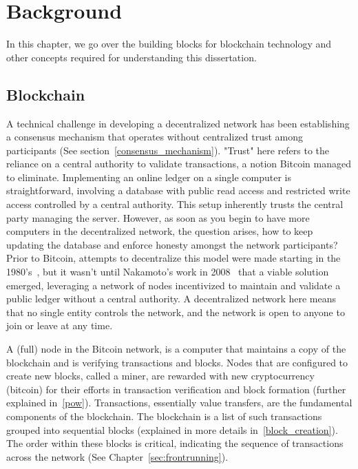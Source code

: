 


\chapter{Background} \label{sec:background}

In this chapter, we go over the building blocks for blockchain technology and other concepts required for understanding this dissertation.

\section{Blockchain}
A technical challenge in developing a decentralized network has been establishing a consensus mechanism that operates without centralized trust among participants (See section~\ref{consensus_mechanism}). "Trust" here refers to the reliance on a central authority to validate transactions, a notion Bitcoin managed to eliminate. Implementing an online ledger on a single computer is straightforward, involving a database with public read access and restricted write access controlled by a central authority. This setup inherently trusts the central party managing the server. However, as soon as you begin to have more computers in the decentralized network, the question arises, how to keep updating the database and enforce honesty amongst the network participants? Prior to Bitcoin, attempts to decentralize this model were made starting in the 1980's~\cite{narayanan2017bitcoin}, but it wasn't until Nakamoto's work in 2008~\cite{nakamoto2008bitcoin} that a viable solution emerged, leveraging a network of nodes incentivized to maintain and validate a public ledger without a central authority. A decentralized network here means that no single entity controls the network, and the network is open to anyone to join or leave at any time.

A (full) node in the Bitcoin network, is a computer that maintains a copy of the blockchain and is verifying transactions and blocks. Nodes that are configured to create new blocks, called a miner, are rewarded with new cryptocurrency (bitcoin) for their efforts in transaction verification and block formation (further explained in~\ref{pow}). Transactions, essentially value transfers, are the fundamental components of the blockchain. The blockchain is a list of such transactions grouped into sequential blocks (explained in more details in~\ref{block_creation}). The order within these blocks is critical, indicating the sequence of transactions across the network (See Chapter~\ref{sec:frontrunning}). 


